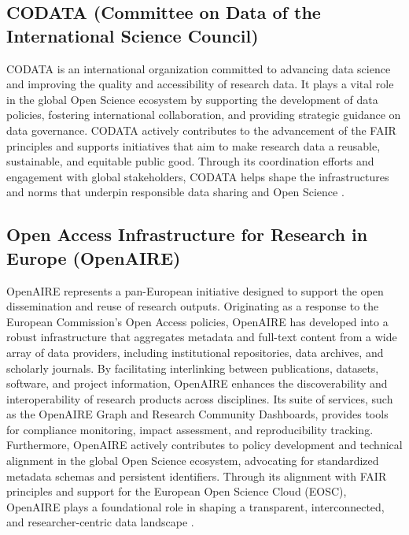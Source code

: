\documentclass{article}
\begin{document}
\subsection{CODATA (Committee on Data of the International Science Council)}
CODATA is an international organization committed to advancing data science and improving the quality and accessibility of research data. It plays a vital role in the global Open Science ecosystem by supporting the development of data policies, fostering international collaboration, and providing strategic guidance on data governance. CODATA actively contributes to the advancement of the FAIR principles and supports initiatives that aim to make research data a reusable, sustainable, and equitable public good. Through its coordination efforts and engagement with global stakeholders, CODATA helps shape the infrastructures and norms that underpin responsible data sharing and Open Science \cite{codata_2024}.

\subsection{Open Access Infrastructure for Research in Europe (OpenAIRE)}
OpenAIRE represents a pan-European initiative designed to support the open dissemination and reuse of research outputs. Originating as a response to the European Commission's Open Access policies, OpenAIRE has developed into a robust infrastructure that aggregates metadata and full-text content from a wide array of data providers, including institutional repositories, data archives, and scholarly journals. By facilitating interlinking between publications, datasets, software, and project information, OpenAIRE enhances the discoverability and interoperability of research products across disciplines. Its suite of services, such as the OpenAIRE Graph and Research Community Dashboards, provides tools for compliance monitoring, impact assessment, and reproducibility tracking. Furthermore, OpenAIRE actively contributes to policy development and technical alignment in the global Open Science ecosystem, advocating for standardized metadata schemas and persistent identifiers. Through its alignment with FAIR principles and support for the European Open Science Cloud (EOSC), OpenAIRE plays a foundational role in shaping a transparent, interconnected, and researcher-centric data landscape \cite{rettberg_openaire_2012}.
\end{document}
